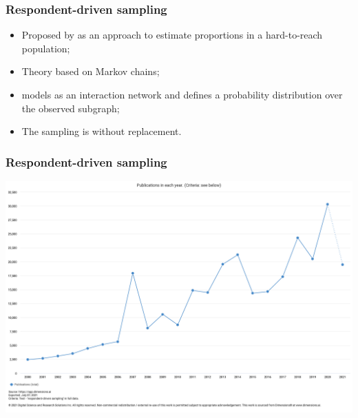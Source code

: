\documentclass{beamer}
\newcommand{\Space}{\vspace{3ex}}
\begin{document}
\begin{frame}
  \frametitle{Respondent-driven sampling}
  
    \begin{itemize}
      \justifying
      \item Proposed by \cite{heckathorn1997} as an approach to estimate
      proportions in a hard-to-reach population; 
  
      \Space
  
      \item Theory based on Markov chains; 
      
      \Space
      
      \item \cite{crawford2016} models as an interaction network and defines a probability distribution over the observed
      subgraph;
      
      \Space 
  
      \item The sampling is without replacement. 
  
    \end{itemize}

\end{frame}

\begin{frame}
  \frametitle{Respondent-driven sampling}

  \includegraphics[width=\textwidth]{../../images/rds-yearly-research.png}

\end{frame}
\end{document}
